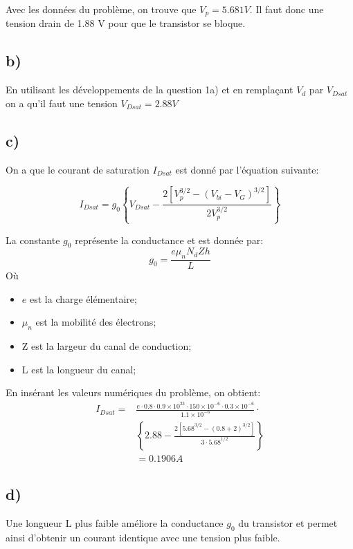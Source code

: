 Avec les données du problème, on trouve que $V_p = 5.681 V$. Il faut donc une tension drain de 1.88 V pour que le transistor se bloque.

\subsection*{b)}
En utilisant les développements de la question 1a) et en remplaçant $V_d$ par $V_{Dsat}$ on a qu'il faut une tension $V_{Dsat} = 2.88V$

\subsection*{c)}
On a que le courant de saturation $I_{Dsat}$ est donné par l'équation suivante:

\begin{equation}
I_{Dsat} = g_0 \left \lbrace V_{Dsat} - \frac{2\left[V_p^{3/2} - (V_{bi}-V_G)^{3/2}\right]}{2V_p^{3/2}}\right\rbrace
\end{equation}

La constante $g_0$ représente la conductance et est donnée par:
\begin{equation}
g_0 = \frac{e \mu_n N_d Zh}{L}
\end{equation}
Où
\begin{itemize}
\item $e$ est la charge élémentaire;
\item $\mu_n$ est la mobilité des électrons;
\item Z est la largeur du canal de conduction;
\item L est la longueur du canal;
\end{itemize}

En insérant les valeurs numériques du problème, on obtient: 
\begin{align}
I_{Dsat} = &\frac{e\cdot 0.8 \cdot 0.9\times 10^{23} \cdot 150\times 10^{-6} \cdot 0.3\times 10^{-6}}{1.1\times 10^{-6}}\cdot\\ 
&\left\lbrace 2.88 - \frac{2\left[5.68^{3/2} - (0.8+2)^{3/2}\right]}{3\cdot 5.68^{1/2}}\right\rbrace\\
&= 0.1906A
\end{align}
\subsection*{d)}

Une longueur L plus faible améliore la conductance $g_0$ du transistor et permet ainsi d'obtenir un courant identique avec une tension plus faible.